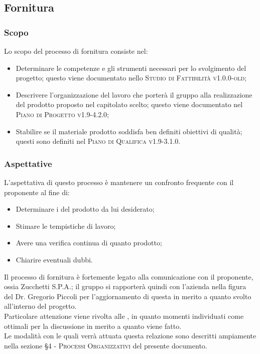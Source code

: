 \documentclass[../norme-di-progetto.tex]{subfiles}
\begin{document}

\subsection{Fornitura}
\subsubsection{Scopo}
Lo scopo del processo di fornitura consiste nel:
\begin{itemize}
  \item Determinare le competenze e gli strumenti necessari per lo svolgimento del progetto; questo viene documentato nello \textsc{Studio di Fattibilità v1.0.0-old};
  \item Descrivere l'organizzazione del lavoro che porterà il gruppo alla realizzazione del prodotto proposto nel capitolato scelto; questo viene documentato nel \textsc{Piano di Progetto v1.9-4.2.0};
  \item Stabilire se il materiale prodotto soddisfa ben definiti obiettivi di qualità; questi sono definiti nel \textsc{Piano di Qualifica v1.9-3.1.0}.
\end{itemize}

\subsubsection{Aspettative}
L'aspettativa di questo processo è mantenere un confronto frequente con il proponente al fine di:
\begin{itemize}
  \item Determinare i  del prodotto da lui desiderato;
  \item Stimare le tempistiche di lavoro;
  \item Avere una verifica continua di quanto prodotto;
  \item Chiarire eventuali dubbi.
\end{itemize}
Il processo di fornitura è fortemente legato alla comunicazione con il proponente, ossia Zucchetti S.P.A.; il gruppo si rapporterà quindi con l'azienda nella figura del Dr. Gregorio Piccoli per l'aggiornamento di questa in merito a quanto svolto all'interno del progetto. \\
Particolare attenzione viene rivolta alle , in quanto momenti individuati come ottimali per la discussione in merito a quanto viene fatto. \\
Le modalità con le quali verrà attuata questa relazione sono descritti ampiamente nella sezione \textsc{\S 4 - Processi Organizzativi} del presente documento.
\end{document}
